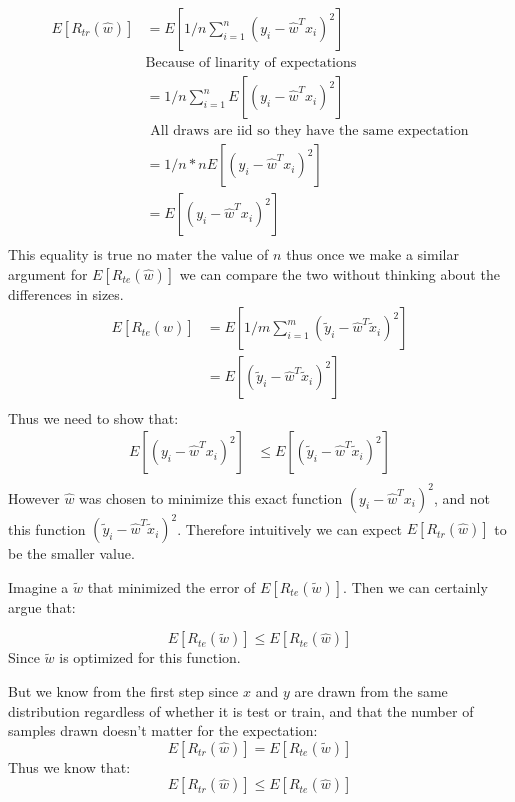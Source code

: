 \documentclass{article}
\newcommand{\1}{\mathbf{1}}
\begin{document}
\begin{align}
    E[R_{tr}(\hat{w})] & = E[1/n \sum_{i=1}^n (y_i - \hat{w}^T x_i)^2] \\
    & \text{Because of linarity of expectations} \\
    & = 1/n \sum_{i=1}^n E[(y_i - \hat{w}^T x_i)^2] \\
    & \text{ All draws are iid so they have the same expectation} \\
    & = 1/n * n E[ (y_i - \hat{w}^T x_i)^2 ] \\
    & =  E[ (y_i - \hat{w}^T x_i)^2 ] \\
\end{align}
This equality is true no mater the value of $n$ thus once we make a similar argument for $E[R_{te}(\hat{w})]$ we can compare the two without thinking about the differences in sizes.
\begin{align}
    E[R_{te}(\hat{w})] & = E[1/m \sum_{i=1}^m (\widetilde{y}_i - \hat{w}^T \widetilde{x}_i)^2] \\
    & = E[ (\widetilde{y}_i - \hat{w}^T \widetilde{x}_i)^2 ] \\
\end{align}
Thus we need to show that:
\begin{align}
       E[ (y_i - \hat{w}^T x_i)^2 ] & \leq E[ (\widetilde{y}_i - \hat{w}^T \widetilde{x}_i)^2 ] \\
\end{align}
However $\hat{w}$ was chosen to minimize this exact function $(y_i - \hat{w}^T x_i)^2$, and not this function $(\widetilde{y}_i - \hat{w}^T \widetilde{x}_i)^2$. Therefore intuitively we can expect $E[R_{tr}(\hat{w})]$ to be the smaller value. 

Imagine a $\widetilde{w}$ that minimized the error of $E[R_{te}(\widetilde{w})]$. Then we can certainly argue that: 

$$ E[R_{te}(\widetilde{w}) ] \leq E[R_{te}(\hat{w})] $$
Since $\widetilde{w}$ is optimized for this function. 

But we know from the first step since $x$ and $y$ are drawn from the same distribution regardless of whether it is test or train, and that the number of samples drawn doesn't matter for the expectation: 
$$ E[R_{tr}(\hat{w}) ] =  E[R_{te}(\widetilde{w})] $$ 
Thus we know that:
$$ E[R_{tr}(\hat{w})] \leq E[R_{te}(\hat{w})] $$ \\
\end{document}
